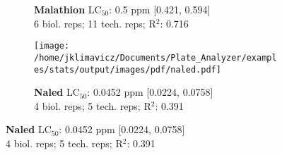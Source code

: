 \documentclass{article}
\begin{document}
\begin{figure}[thp!]
\begin{subfigure}{0.500\textwidth}
      \vspace{-0.05cm}
      \caption*{\textbf{Malathion} LC$_{50}$: 0.5 ppm [0.421, 0.594] \\ 
6 biol. reps; 11 tech. reps; R$^2$: 0.716}
      \vspace{0.1cm}
   \end{subfigure}%
   \begin{subfigure}{0.500\textwidth}
      \centering
      \texttt{[image: /home/jklimavicz/Documents/Plate\_Analyzer/examples/stats/output/images/pdf/naled.pdf]}
      \vspace{-0.05cm}
      \caption*{\textbf{Naled} LC$_{50}$: 0.0452 ppm [0.0224, 0.0758] \\ 
4 biol. reps; 5 tech. reps; R$^2$: 0.391}
      \vspace{0.1cm}
   \end{subfigure}%
\end{figure}
\clearpage
\pagebreak
\vspace{-0.1cm}
\end{document}
